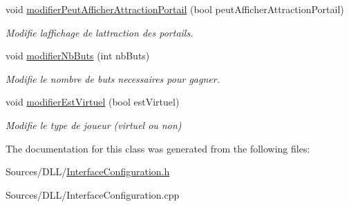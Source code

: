 \begin{DoxyCompactItemize}
void \hyperlink{group__inf2990_ga5ed1955471ea5a179b61d7f921603d26}{modifier\+Peut\+Afficher\+Attraction\+Portail} (bool peut\+Afficher\+Attraction\+Portail)
\begin{DoxyCompactList}\small\item\em Modifie l\textquotesingle{}affichage de l\textquotesingle{}attraction des portails. \end{DoxyCompactList}\item 
void \hyperlink{group__inf2990_ga570191806ecab091e74861a8a01f1ff9}{modifier\+Nb\+Buts} (int nb\+Buts)
\begin{DoxyCompactList}\small\item\em Modifie le nombre de buts necessaires pour gagner. \end{DoxyCompactList}\item 
void \hyperlink{group__inf2990_ga80f804298396f27f820928b7fb72ebfd}{modifier\+Est\+Virtuel} (bool est\+Virtuel)
\begin{DoxyCompactList}\small\item\em Modifie le type de joueur (virtuel ou non) \end{DoxyCompactList}\end{DoxyCompactItemize}


The documentation for this class was generated from the following files\+:\begin{DoxyCompactItemize}
\item 
Sources/\+D\+L\+L/\hyperlink{_interface_configuration_8h}{Interface\+Configuration.\+h}\item 
Sources/\+D\+L\+L/Interface\+Configuration.\+cpp\end{DoxyCompactItemize}
